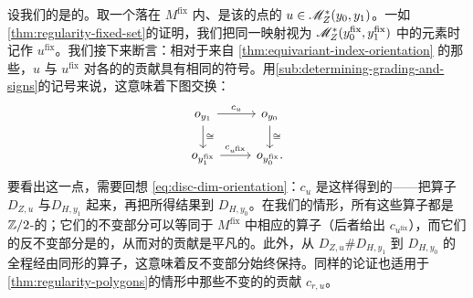 设我们的\trFloerDatum{}是\trRegular{}的。取一个落在 $M^{\mathrm{fix}}$ 内、是该\trModuliSpace{}的\trIsolated{}点的 $u\in\mathscr{M}^*_Z(y_0,y_1)$。一如\cref{thm:regularity-fixed-set}的证明，我们把同一映射视为 $\mathscr{M}^*_Z(y_0^{\mathrm{fix}},y_1^{\mathrm{fix}})$ 中的元素时记作 $u^{\mathrm{fix}}$。我们接下来断言：相对于来自 \cref{thm:equivariant-index-orientation} 的那些\trIsomorphism，$u$ 与 $u^{\mathrm{fix}}$ 对各\trFloerComplex{}的\trDifferential{}的贡献具有相同的符号。用\cref{sub:determining-grading-and-signs}的记号来说，这意味着下图交换：
\begin{equation}\label{eq:equivariant-cu-diagram}
\begin{tikzcd}
o_{y_1}\ar[r,"c_u"]\ar[d,"\cong"] & o_{y_0}\ar[d,"\cong"] \\
o_{y_1^{\mathrm{fix}}}\ar[r,"c_{u^{\mathrm{fix}}}"] & o_{y_0^{\mathrm{fix}}}.
\end{tikzcd}
\end{equation}
要看出这一点，需要回想 \eqref{eq:disc-dim-orientation}：$c_u$ 是这样得到的——把\trLinearization{}算子 $D_{Z,u}$ 与\trOrientationOperator{}$D_{H,y_1}$ \trGluing{}起来，再把所得结果\trDeformation{}到 $D_{H,y_0}$。在我们的情形，所有这些算子都是 $\mathbb{Z}/2$-\trEquivariant{}的；它们的不变部分可以等同于 $M^{\mathrm{fix}}$ 中相应的算子（后者给出 $c_{u^{\mathrm{fix}}}$），而它们的反不变部分是\trInvertible{}的，从而对\trDeterminantLine{}的贡献是平凡的。此外，从 $D_{Z,u}\#D_{H,y_1}$ 到 $D_{H,y_0}$ 的\trHomotopy{}全程经由同形的算子，这意味着反不变部分始终保持\trInvertible{}。同样的论证也适用于\cref{thm:regularity-polygons}的情形中那些不变的\trIsolated{}\trPseudoholomorphic\trPolygon{}的贡献 $c_{r,u}$。
